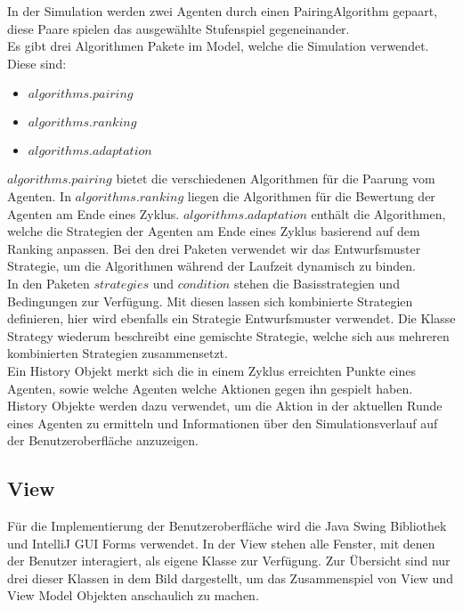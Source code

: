 In der Simulation werden zwei Agenten durch einen PairingAlgorithm gepaart, diese Paare spielen das ausgewählte Stufenspiel gegeneinander.\\

Es gibt drei Algorithmen Pakete im Model, welche die Simulation verwendet. Diese sind: 
\begin{itemize}
\item $algorithms.pairing$
\item $algorithms.ranking$
\item $algorithms.adaptation$
\end{itemize}
$algorithms.pairing$ bietet die verschiedenen Algorithmen für die Paarung vom Agenten. In $algorithms.ranking$ liegen die Algorithmen für die Bewertung der Agenten am Ende eines Zyklus. $algorithms.adaptation$ enthält die Algorithmen, welche die Strategien der Agenten am Ende eines Zyklus basierend auf dem Ranking anpassen. Bei den drei Paketen verwendet wir das Entwurfsmuster Strategie, um die Algorithmen während der Laufzeit dynamisch zu binden.\\

In den Paketen $strategies$ und $condition$ stehen die Basisstrategien und Bedingungen zur Verfügung. Mit diesen lassen sich kombinierte Strategien definieren, hier wird ebenfalls ein Strategie Entwurfsmuster verwendet. Die Klasse Strategy wiederum beschreibt eine gemischte Strategie, welche sich aus mehreren kombinierten Strategien zusammensetzt.\\

Ein History Objekt merkt sich die in einem Zyklus erreichten Punkte eines Agenten, sowie welche Agenten welche Aktionen gegen ihn gespielt haben. History Objekte werden dazu verwendet, um die Aktion in der aktuellen Runde eines Agenten zu ermitteln und Informationen über den Simulationsverlauf auf der Benutzeroberfläche anzuzeigen.


\subsection{View}

\noindent
{}

Für die Implementierung der Benutzeroberfläche wird die Java Swing Bibliothek und IntelliJ GUI Forms verwendet. In der View stehen alle Fenster, mit denen der Benutzer interagiert, als eigene Klasse zur Verfügung. Zur Übersicht sind nur drei dieser Klassen in dem Bild dargestellt, um das Zusammenspiel von View und View Model Objekten anschaulich zu machen.\\ 

